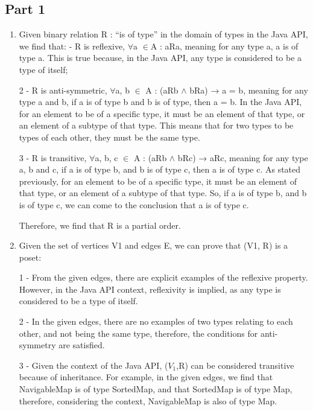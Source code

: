 \documentclass[12pt]{article}
\begin{document}
\subsection*{Part 1}
\begin{enumerate}
	\item
	Given binary relation R : “is of type” in the domain of types in the Java API, we find that: - R is reflexive, $\forall$a $\in$A : aRa, meaning for any type a, a is of type a. This is true because, in the Java API, any type is considered to be a type of itself;
	
	2 - R is anti-symmetric, $\forall$a, b $\in$ A : (aRb $\wedge$ bRa) → a = b, meaning for any type a and b, if a is of type b and b is of type, then a = b. In the Java API, for an element to be of a specific type, it must be an element of that type, or an element of a subtype of that type. This means that for two types to be types of each other, they must be the same type.
	
	3 - R is transitive, $\forall$a, b, c $\in$ A : (aRb $\wedge$ bRc) → aRc, meaning for any type a, b and c, if a is of type b, and b is of type c, then a is of type c. As stated previously, for an element to be of a specific type, it must be an element of that type, or an element of a subtype of that type. So, if a is of type b, and b is of type c, we can come to the conclusion that a is of type c.
	
	Therefore, we find that R is a partial order.
	\item
	Given the set of vertices V1 and edges E, we can prove that (V1, R) is a poset:
	
	1 - From the given edges, there are explicit examples of the reflexive property. However, in the Java API context, reflexivity is implied, as any type is considered to be a type of itself.
	
	2 - In the given edges, there are no examples of two types relating to each other, and not being the same type, therefore, the conditions for anti-symmetry are satisfied.
	
	3 - Given the context of the Java API, (\(V_1\),R) can be considered transitive because of inheritance. For example, in the given edges, we find that NavigableMap is of type SortedMap, and that SortedMap is of type Map, therefore, considering the context, NavigableMap is also of type Map.
	

\end{enumerate}
\end{document}
